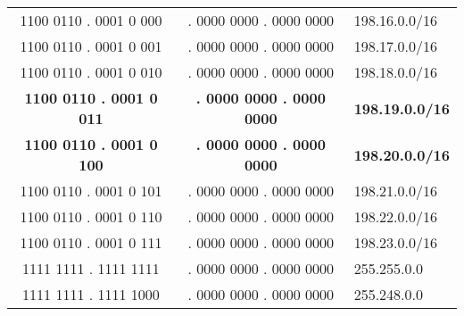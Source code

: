 {\begin{center}
\sffamily
\begin{tabular}{c|cl}
\color{spot1} 1100 0110 . 0001 0\color{spot2} 000 & . 0000 0000 . 0000 0000 & 198.16.0.0/16 \\
\color{spot1} 1100 0110 . 0001 0\color{spot2} 001 & . 0000 0000 . 0000 0000 & 198.17.0.0/16 \\
\color{spot1} 1100 0110 . 0001 0\color{spot2} 010 & . 0000 0000 . 0000 0000 & 198.18.0.0/16 \\
\bfseries\color{spot1} 1100 0110 . 0001 0\bfseries\color{spot2} 011 & \bfseries . 0000 0000 . 0000 0000 & \bfseries198.19.0.0/16 \\
\bfseries\color{spot1} 1100 0110 . 0001 0\bfseries\color{spot2} 100 & \bfseries . 0000 0000 . 0000 0000 & \bfseries 198.20.0.0/16 \\
\color{spot1} 1100 0110 . 0001 0\color{spot2} 101 & . 0000 0000 . 0000 0000 & 198.21.0.0/16 \\
\color{spot1} 1100 0110 . 0001 0\color{spot2} 110 & . 0000 0000 . 0000 0000 & 198.22.0.0/16 \\
\color{spot1} 1100 0110 . 0001 0\color{spot2} 111 & . 0000 0000 . 0000 0000 & 198.23.0.0/16 \\
\hline
1111 1111 . 1111 1111 & . 0000 0000 . 0000 0000 & 255.255.0.0 \\
1111 1111 . 1111 1000 & . 0000 0000 . 0000 0000 & 255.248.0.0 \\
\end{tabular}
\end{center}
}




\label{sec:subnetting}

